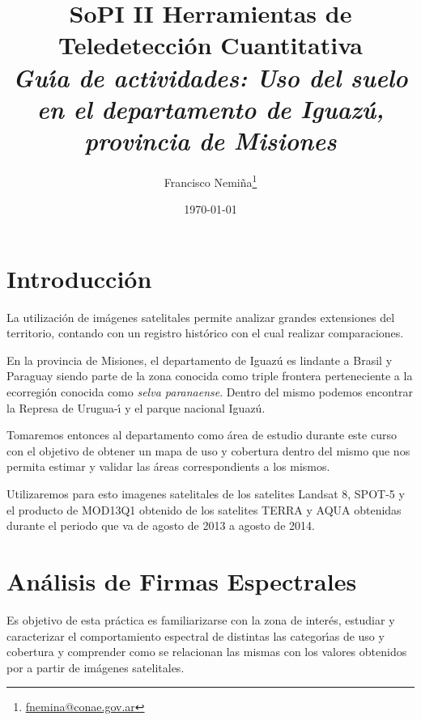\documentclass[hidelinks,12pt]{article}
\title{SoPI II \- Herramientas de Teledetecci\'on Cuantitativa \\ 
\emph{Gu\'{\i}a de actividades: Uso del suelo en el departamento de Iguaz\'u,
provincia de Misiones}}
\author{Francisco
Nemi\~na\thanks{\href{mailto:fnemina@conae.govar}{fnemina@conae.gov.ar}}}
\affil{Unidad de Educaci\'on y Formaci\'on Masiva\\ 
    Comisi\'on Nacional de Actividades Espaciales}
\date{\today}
\begin{document}
\maketitle

\section*{Introducci\'on}

La utilización de imágenes satelitales permite analizar grandes extensiones del
territorio, contando con un registro histórico con el cual realizar
comparaciones.

En la provincia de Misiones, el departamento de Iguaz\'u es lindante a Brasil y 
Paraguay siendo parte de la zona conocida como triple frontera
perteneciente a la ecorregi\'on conocida como \emph{selva paranaense}. Dentro del 
mismo podemos encontrar la Represa de Urugua-\'{\i} y el parque nacional
Iguaz\'u.

Tomaremos entonces al departamento como \'area de estudio durante este curso
con el objetivo de obtener un mapa de uso y cobertura dentro del mismo que nos
permita estimar y validar  las \'areas correspondients a los mismos. 

Utilizaremos para esto imagenes satelitales de los satelites Landsat 8, SPOT-5 y
el producto de MOD13Q1 obtenido de los satelites TERRA y AQUA obtenidas durante el
periodo que va de agosto de 2013 a agosto de 2014. 

\newpage
\section{Análisis de Firmas Espectrales}
Es objetivo de esta pr\'actica es familiarizarse con la zona de inter\'es, estudiar
y caracterizar el comportamiento espectral de distintas las categor\'{\i}as de uso y
cobertura y comprender como se relacionan las mismas con los valores obtenidos 
por a partir de im\'agenes  satelitales.
\end{document}
